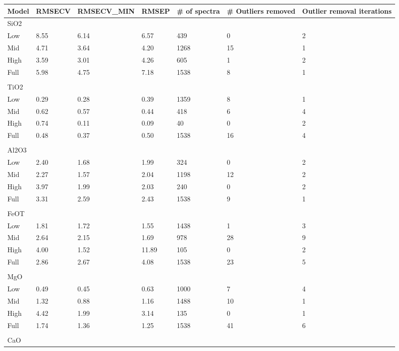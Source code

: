 \begin{table}[htbp] %
\centering
\begin{tabular*}{\textwidth}{@{\extracolsep{\fill}} lllllll}
\hline
Model & RMSECV & RMSECV\_MIN & RMSEP & \# of spectra & \# Outliers removed & Outlier removal iterations  \\
\hline
SiO2 &&&&&& \\
  Low & 8.55 & 6.14 & 6.57 & 439 & 0 & 2 \\
  Mid & 4.71 & 3.64 & 4.20 & 1268 & 15 & 1 \\
  High & 3.59 & 3.01 & 4.26 & 605 & 1 & 2 \\
  Full & 5.98 & 4.75 & 7.18 & 1538 & 8 & 1 \\
\\
TiO2 &&&&&& \\
  Low & 0.29 & 0.28 & 0.39 & 1359 & 8 & 1 \\
  Mid & 0.62 & 0.57 & 0.44 & 418 & 6 & 4 \\
  High & 0.74 & 0.11 & 0.09 & 40 & 0 & 2 \\
  Full & 0.48 & 0.37 & 0.50 & 1538 & 16 & 4 \\
\\
Al2O3 &&&&&& \\
  Low & 2.40 & 1.68 & 1.99 & 324 & 0 & 2 \\
  Mid & 2.27 & 1.57 & 2.04 & 1198 & 12 & 2 \\
  High & 3.97 & 1.99 & 2.03 & 240 & 0 & 2 \\
  Full & 3.31 & 2.59 & 2.43 & 1538 & 9 & 1 \\
\\
FeOT &&&&&& \\
  Low & 1.81 & 1.72 & 1.55 & 1438 & 1 & 3 \\
  Mid & 2.64 & 2.15 & 1.69 & 978 & 28 & 9 \\
  High & 4.00 & 1.52 & 11.89 & 105 & 0 & 2 \\
  Full & 2.86 & 2.67 & 4.08 & 1538 & 23 & 5 \\
\\
MgO &&&&&& \\
  Low & 0.49 & 0.45 & 0.63 & 1000 & 7 & 4 \\
  Mid & 1.32 & 0.88 & 1.16 & 1488 & 10 & 1 \\
  High & 4.42 & 1.99 & 3.14 & 135 & 0 & 1 \\
  Full & 1.74 & 1.36 & 1.25 & 1538 & 41 & 6 \\
\\
CaO &&&&&& \\

\end{tabular*}
\end{table}
